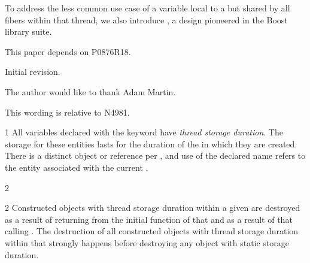 \documentclass[fontsize=10pt,paper=A4,pagesize,DIV=15]{scrartcl}
\begin{document}
To address the less common use case of a variable local to a \thread but
shared by all fibers within that thread, we also introduce \tptr, a design
pioneered in the Boost library suite.\cite{Boost}

This paper depends on P0876R18.

\label{history}
Initial revision.


{}

The author would like to thank Adam Martin.

\label{api}

This wording is relative to N4981\cite{Standard}.


1 All variables declared with the  keyword have
\emph{thread storage duration}.
The storage for these entities lasts for the duration of
the  in which they are created. There is a distinct object or reference
per , and use of the declared name refers to the entity associated with
the current .

2 


2 Constructed objects with thread storage duration within a given 
are destroyed as a result of returning from the initial function of that  and as a
result of that  calling .
The destruction of all constructed objects with thread storage
duration within that  strongly happens before destroying
any object with static storage duration.

\end{document}
